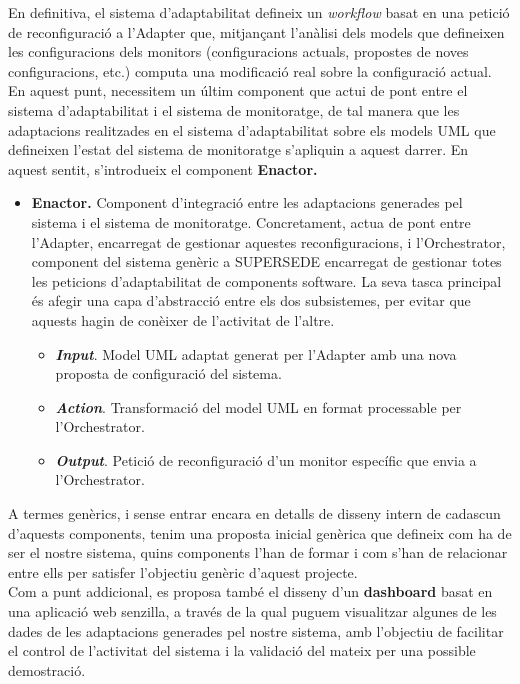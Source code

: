 En definitiva, el sistema d'adaptabilitat defineix un \textit{workflow} basat en una petició de reconfiguració a l'Adapter que, mitjançant l'anàlisi dels models que defineixen les configuracions dels monitors (configuracions actuals, propostes de noves configuracions, etc.) computa una modificació real sobre la configuració actual.\\

En aquest punt, necessitem un últim component que actui de pont entre el sistema d'adaptabilitat i el sistema de monitoratge, de tal manera que les adaptacions realitzades en el sistema d'adaptabilitat sobre els models UML que defineixen l'estat del sistema de monitoratge s'apliquin a aquest darrer. En aquest sentit, s'introdueix el component \textbf{Enactor.}

\begin{itemize}
\item \textbf{Enactor.} Component d'integració entre les adaptacions generades pel sistema i el sistema de monitoratge. Concretament, actua de pont entre l'Adapter, encarregat de gestionar aquestes reconfiguracions, i l'Orchestrator, component del sistema genèric a SUPERSEDE encarregat de gestionar totes les peticions d'adaptabilitat de components software. La seva tasca principal és afegir una capa d'abstracció entre els dos subsistemes, per evitar que aquests hagin de conèixer de l'activitat de l'altre.
\begin{itemize}
\item \textbf{\textit{Input}}. Model UML adaptat generat per l'Adapter amb una nova proposta de configuració del sistema.
\item \textbf{\textit{Action}}. Transformació del model UML en format processable per l'Orchestrator.
\item \textbf{\textit{Output}}. Petició de reconfiguració d'un monitor específic que envia a l'Orchestrator.
\end{itemize}
\end{itemize}

A termes genèrics, i sense entrar encara en detalls de disseny intern de cadascun d'aquests components, tenim una proposta inicial genèrica que defineix com ha de ser el nostre sistema, quins components l'han de formar i com s'han de relacionar entre ells per satisfer l'objectiu genèric d'aquest projecte.\\

Com a punt addicional, es proposa també el disseny d'un \textbf{dashboard} basat en una aplicació web senzilla, a través de la qual puguem visualitzar algunes de les dades de les adaptacions generades pel nostre sistema, amb l'objectiu de facilitar el control de l'activitat del sistema i la validació del mateix per una possible demostració.

